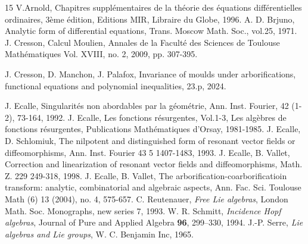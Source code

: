 \documentclass[english,11pt]{amsart}
\begin{document}
\begin{thebibliography}{15}
 V.Arnold, Chapitres suppl\'ementaires de la th\'eorie des \'equations diff\'erentielles ordinaires, 3\`eme \'edition, Editions MIR, Libraire du Globe, 1996.  
 A. D. Brjuno, Analytic form of differential equations, Trans. Moscow Math. Soc., vol.25, 1971.
 J. Cresson, {Calcul Moulien}, Annales de la Facult\'e des Sciences de Toulouse Math\'ematiques Vol. XVIII, no. 2, 2009, pp. 307-395.

 J. Cresson, D. Manchon, J. Palafox, Invariance of moulds under arborifications, functional equations and polynomial inequalities, 23.p, 2024.

 J. Ecalle, Singularit\'es non abordables par la g\'eom\'etrie, Ann. Inst. Fourier, 42 (1-2), 73-164, 1992.
 J. Ecalle, Les fonctions r\'esurgentes, Vol.1-3, Les alg\`ebres de fonctions r\'esurgentes, Publications Math\'ematiques d'Orsay, 1981-1985.
 J. Ecalle, D. Schlomiuk, The nilpotent and distinguished form of resonant vector fields or diffeomorphisms, Ann. Inst. Fourier 43 5 1407-1483, 1993.
 J. Ecalle, B. Vallet, Correction and linearization of resonant vector fields and diffeomorphisms, Math. Z. 229 249-318, 1998.
 J. Ecalle, B. Vallet, The arborification-coarborificatioin transform: analytic, combinatorial and algebraic aspects, Ann. Fac. Sci. Toulouse Math (6) 13 (2004), no. 4, 575-657.
 C. Reutenauer, {\it Free Lie algebras}, London Math. Soc. Monographs, new series 7, 1993.
W. R. Schmitt, {\em Incidence Hopf algebras\/},
Journal of Pure and Applied Algebra \textbf{96}, 299--330, 1994.
 J.-P. Serre, {\it Lie algebras and Lie groups}, W. C. Benjamin Inc, 1965.
\end{thebibliography}
\end{document}
